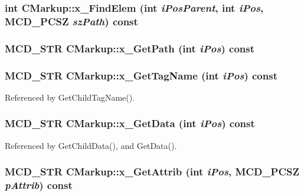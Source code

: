 \subsubsection[x\_\-FindElem]{\setlength{\rightskip}{0pt plus 5cm}int CMarkup::x\_\-FindElem (int {\em iPosParent}, \/  int {\em iPos}, \/  MCD\_\-PCSZ {\em szPath}) const\hspace{0.3cm}{\tt  [protected]}}\label{classCMarkup_6d2f2950334d6e3e126ee5e8574f77b4}


\subsubsection[x\_\-GetPath]{\setlength{\rightskip}{0pt plus 5cm}MCD\_\-STR CMarkup::x\_\-GetPath (int {\em iPos}) const\hspace{0.3cm}{\tt  [protected]}}\label{classCMarkup_cc202d08dd9465e74b26e9275a740356}


\subsubsection[x\_\-GetTagName]{\setlength{\rightskip}{0pt plus 5cm}MCD\_\-STR CMarkup::x\_\-GetTagName (int {\em iPos}) const\hspace{0.3cm}{\tt  [protected]}}\label{classCMarkup_10cf51b58f6c144f4b7dd1c577277bee}




Referenced by GetChildTagName().
\subsubsection[x\_\-GetData]{\setlength{\rightskip}{0pt plus 5cm}MCD\_\-STR CMarkup::x\_\-GetData (int {\em iPos}) const\hspace{0.3cm}{\tt  [protected]}}\label{classCMarkup_3ce9132cb71e0b343141a7ba3102cea6}




Referenced by GetChildData(), and GetData().
\subsubsection[x\_\-GetAttrib]{\setlength{\rightskip}{0pt plus 5cm}MCD\_\-STR CMarkup::x\_\-GetAttrib (int {\em iPos}, \/  MCD\_\-PCSZ {\em pAttrib}) const\hspace{0.3cm}{\tt  [protected]}}\label{classCMarkup_e92d1478dd44c06bd366b5f26f8a5fe2}





